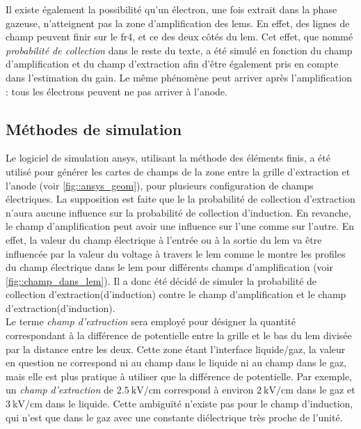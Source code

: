         Il existe également la possibilité qu'un électron, une fois extrait dans la phase gazeuse, n'atteignent pas la zone d'amplification des \glspl{lem}. En effet, des lignes de champ peuvent finir sur le \gls{fr4}, et ce des deux côtés du \gls{lem}. Cet effet, que nommé \textit{probabilité de collection} dans le reste du texte, a été simulé en fonction du champ d'amplification et du champ d'extraction afin d'être également pris en compte dans l'estimation du gain. Le même phénomène peut arriver après l'amplification : tous les électrons peuvent ne pas arriver à l'anode.
        
        \subsection{Méthodes de simulation}
        
            Le logiciel de simulation \gls{ansys}, utilisant la méthode des éléments finis, a été utilisé pour générer les cartes de champs de la zone entre la grille d'extraction et l'anode (voir \autoref{fig::ansys_geom}), pour plusieurs configuration de champs électriques. La supposition est faite que le la probabilité de collection d'extraction n'aura aucune influence sur la probabilité de collection d'induction. En revanche, le champ d'amplification peut avoir une influence sur l'une comme sur l'autre. En effet, la valeur du champ électrique à l'entrée ou à la sortie du \gls{lem} va être influencée par la valeur du voltage à travers le \gls{lem} comme le montre les profiles du champ électrique dans le \gls{lem} pour différents champs d'amplification (voir \autoref{fig::champ_dans_lem}). Il a donc été décidé de simuler la probabilité de collection d'extraction(d'induction) contre le champ d'amplification et le champ d'extraction(d'induction).\\
            
            Le terme \textit{champ d'extraction} sera employé pour désigner la quantité correspondant à la différence de potentielle entre la grille et le bas du \gls{lem} divisée par la distance entre les deux. Cette zone étant l'interface liquide/gaz, la valeur en question ne correspond ni au champ dans le liquide ni au champ dans le gaz, mais elle est plus pratique à utiliser que la différence de potentielle. Par exemple, un \textit{champ d'extraction} de $\SI{2.5}{\kilo\volt\per\centi\meter}$ correspond à environ $\SI{2}{\kilo\volt\per\centi\meter}$ dans le gaz et $\SI{3}{\kilo\volt\per\centi\meter}$ dans le liquide. Cette ambiguïté n'existe pas pour le champ d'induction, qui n'est que dans le gaz avec une constante diélectrique très proche de l'unité.\\
            
